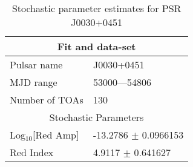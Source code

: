 \documentclass{article}
\begin{document}
\begin{table*}
\caption{Stochastic parameter estimates for PSR J0030+0451}
\begin{tabular}{ll}
\hline\hline
\multicolumn{2}{c}{Fit and data-set} \\ 
\hline
Pulsar name\dotfill & J0030+0451 \\ 
MJD range\dotfill & 53000---54806 \\ 
Number of TOAs\dotfill & 130 \\
\hline
\multicolumn{2}{c}{Stochastic Parameters} \\ 
\hline
Log$_{10}$[Red Amp] \dotfill & -13.2786 $\pm$ 0.0966153  \\ 
Red Index \dotfill & 4.9117 $\pm$ 0.641627  \\ 
\hline
\end{tabular}
\label{Table:J0030+0451}
\end{table*} 
\end{document}
